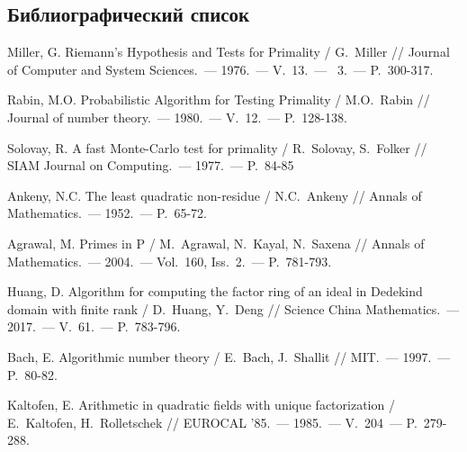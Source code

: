 \documentclass[_00_dissertation.tex]{subfiles}
\begin{document}

\renewcommand{\bibname}{Список использованных источников}

\begin{thebibliography}{99}
\section*{Библиографический список}
\vspace{-12pt}

    Miller, G. Riemann's Hypothesis and Tests for Primality / G.~Miller // Journal of Computer and System Sciences.~--- 1976.~--- V.~13.~--- ~3.~--- P.~300-317.

    Rabin, M.O. Probabilistic Algorithm for Testing Primality / M.O.~Rabin // Journal of number theory.~--- 1980.~--- V.~12.~--- P.~128-138.

    Solovay, R. A fast Monte-Carlo test for primality / R.~Solovay, S.~Folker // SIAM Journal on Computing.~--- 1977.~--- P.~84-85

    Ankeny, N.C. The least quadratic non-residue / N.C.~Ankeny // Annals of Mathematics.~--- 1952.~--- P.~65-72.

    Agrawal, M. Primes in P / M.~Agrawal, N.~Kayal, N.~Saxena // Annals of Mathematics.~--- 2004.~--- Vol.~160, Iss.~2.~--- P.~781-793.

    Huang, D. Algorithm for computing the factor ring of an ideal in Dedekind domain with finite rank / D.~Huang, Y.~Deng // Science China Mathematics.~--- 2017.~--- V.~61.~--- P.~783-796.

    Bach, E. Algorithmic number theory / E.~Bach, J.~Shallit // MIT.~--- 1997.~--- P.~80-82.

    Kaltofen, E. Arithmetic in quadratic fields with unique factorization / E.~Kaltofen, H.~Rolletschek // EUROCAL '85.~--- 1985.~--- V.~204~--- P.~279-288.


\end{thebibliography}
\end{document}
